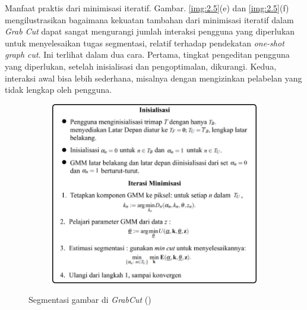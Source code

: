 Manfaat praktis dari minimisasi iteratif. Gambar. \ref{img:2.5}(e) dan \ref{img:2.5}(f) 
mengilustrasikan bagaimana kekuatan tambahan dari minimisasi iteratif dalam 
\emph{Grab Cut} dapat sangat mengurangi jumlah interaksi pengguna yang diperlukan 
untuk menyelesaikan tugas segmentasi, relatif terhadap pendekatan \emph{one-shot graph cut}. 
Ini terlihat dalam dua cara. Pertama, tingkat pengeditan pengguna yang diperlukan, 
setelah inisialisasi dan pengoptimalan, dikurangi. Kedua, interaksi awal bisa lebih 
sederhana, misalnya dengan mengizinkan pelabelan yang tidak lengkap oleh pengguna.

\begin{figure}[H]
  \centering
    \begin{subfigure}{0.7\textwidth}
      \centering{}
      \includegraphics[width=\textwidth]{gambar/alur_grabcut_paper.png}
    \end{subfigure}     
  \caption{
    Segmentasi gambar di \emph{GrabCut} (\cite{Rother:2004})
    }
  \label{img:segmentasi_grabcut}
\end{figure}


